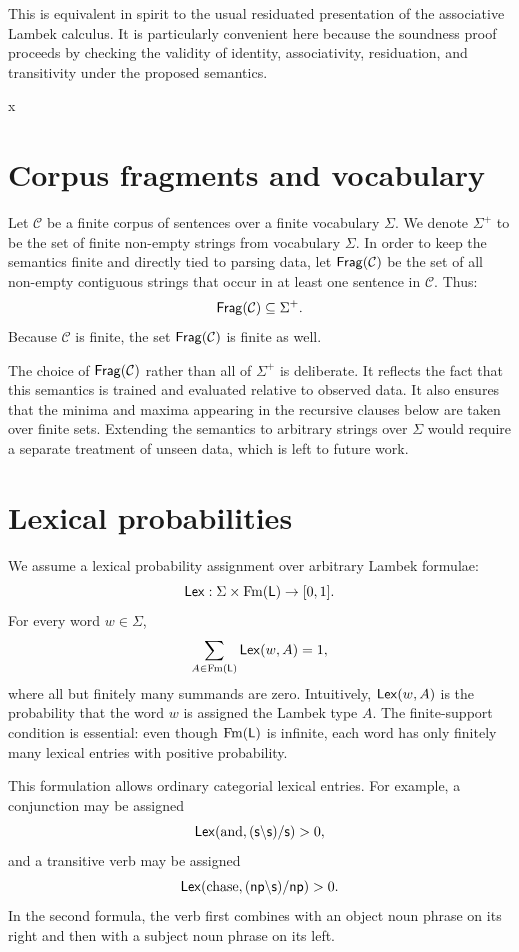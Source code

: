 This is equivalent in spirit to the usual residuated presentation of the associative Lambek
calculus. It is particularly convenient here because the soundness proof proceeds by checking the
validity of identity, associativity, residuation, and transitivity under the proposed semantics.


x\section{Corpus fragments and vocabulary}
Let $\mathcal C$ be a finite corpus of sentences over a finite vocabulary $\Sigma$. We denote $\Sigma^+$ to be the set of finite non-empty strings from vocabulary $\Sigma$. In order to keep the
semantics finite and directly tied to parsing data, let $\mathsf{Frag}(\mathcal C)$ be the set of all non-empty
contiguous strings that occur in at least one sentence in $\mathcal C$. Thus:
\[
\mathsf{Frag}(\mathcal C) \subseteq \Sigma^+.
\]
Because $\mathcal C$ is finite, the set $\mathsf{Frag}(\mathcal C)$ is finite as well.

The choice of $\mathsf{Frag}(\mathcal C)$ rather than all of $\Sigma^+$ is deliberate. It reflects the fact that
this semantics is trained and evaluated relative to observed data. It also ensures that the minima
and maxima appearing in the recursive clauses below are taken over finite sets. Extending the
semantics to arbitrary strings over $\Sigma$ would require a separate treatment of unseen data,
which is left to future work.


\section{Lexical probabilities}
We assume a lexical probability assignment over arbitrary Lambek formulae:
\[
\mathsf{Lex} : \Sigma \times \mathrm{Fm}(\mathsf{L}) \to [0,1].
\]
For every word $w \in \Sigma$,
\[
\sum_{A \in \mathrm{Fm}(\mathsf{L})} \mathsf{Lex}(w,A) = 1,
\]
where all but finitely many summands are zero. Intuitively, $\mathsf{Lex}(w,A)$ is the probability that
the word $w$ is assigned the Lambek type $A$. The finite-support condition is essential: even
though $\mathrm{Fm}(\mathsf{L})$ is infinite, each word has only finitely many lexical entries with
positive probability.

This formulation allows ordinary categorial lexical entries. For example, a conjunction may be
assigned
\[
\mathsf{Lex}(\text{and},(\mathsf{s}\backslash \mathsf{s})/\mathsf{s})>0,
\]
and a transitive verb may be assigned
\[
\mathsf{Lex}(\text{chase},(\mathsf{np}\backslash \mathsf{s})/\mathsf{np})>0.
\]
In the second formula, the verb first combines with an object noun phrase on its right and then
with a subject noun phrase on its left.

